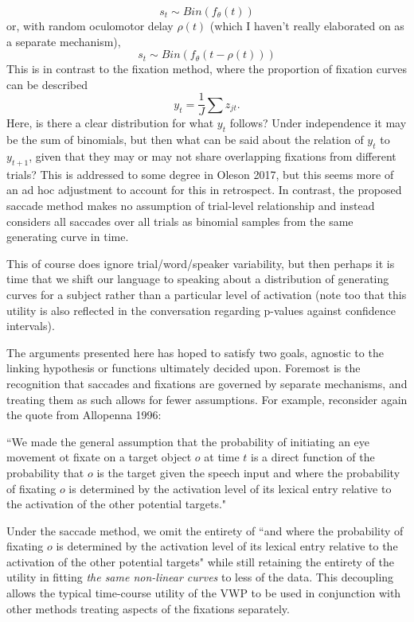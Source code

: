 \documentclass{article}
\begin{document}
\begin{equation} \label{eq:saccade_dist}
s_t \sim Bin(f_{\theta}(t))
\end{equation}
or, with random oculomotor delay $\rho(t)$ (which I haven't really elaborated on as a separate mechanism), 
\begin{equation} \label{eq:saccade_dist_rho}
s_t \sim Bin(f_{\theta}(t-\rho(t)))
\end{equation}
This is in contrast to the fixation method, where the proportion of fixation curves can be described
\begin{equation} \label{eq:single_fix_measure}
y_t = \frac{1}{J} \sum z_{jt}.
\end{equation}
Here, is there a clear distribution for what $y_t$ follows? Under independence it may be the sum of binomials, but then what can be said about the relation of $y_t$ to $y_{t+1}$, given that they may or may not share overlapping fixations from different trials? This is addressed to some degree in Oleson 2017, but this seems more of an ad hoc adjustment to account for this in retrospect. In contrast, the proposed saccade method makes no assumption of trial-level relationship and instead considers all saccades over all trials as binomial samples from the same generating curve in time.

This of course does ignore trial/word/speaker variability, but then perhaps it is time that we shift our language to speaking about a distribution of generating curves for a subject rather than a particular level of activation (note too that this utility is also reflected in the conversation regarding p-values against confidence intervals). 

The arguments presented here has hoped to satisfy two goals, agnostic to the linking hypothesis or functions ultimately decided upon. Foremost is the recognition that saccades and fixations are governed by separate mechanisms, and treating them as such allows for fewer assumptions. For example, reconsider again the quote from Allopenna 1996:

 ``We made the general assumption that the probability of initiating an eye movement ot fixate on a target object $o$ at time $t$ is a direct function of the probability that $o$ is the target given the speech input and where the probability of fixating $o$ is determined by the activation level of its lexical entry relative to the activation of the other potential targets."
 
Under the saccade method, we omit the entirety of ``and where the probability of fixating $o$ is determined by the activation level of its lexical entry relative to the activation of the other potential targets" while still retaining the entirety of the utility in fitting \textit{the same non-linear curves} to less of the data. This decoupling allows the typical time-course utility of the VWP to be used in conjunction with other  methods treating aspects of the fixations separately.
\end{document}
